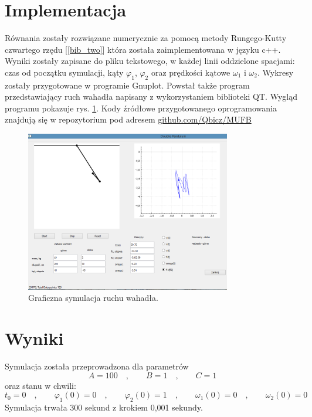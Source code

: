 \documentclass[11pt]{aghdpl}
\begin{document}
\clearpage
\section{Implementacja}
Równania zostały rozwiązane numerycznie za pomocą metody Rungego-Kutty czwartego rzędu [\ref{bib_two}] która została zaimplementowana w języku c++. Wyniki zostały zapisane do pliku tekstowego, w każdej linii oddzielone spacjami: czas od początku symulacji, kąty $\varphi_1$, $\varphi_2$ oraz prędkości kątowe $\omega_1$ i $\omega_2$. Wykresy zostały przygotowane w programie Gnuplot. Powstał także program przedstawiający ruch wahadła napisany z wykorzystaniem biblioteki QT. Wygląd programu pokazuje rys. \ref{QTgui}. Kody źródłowe przygotowanego oprogramowania znajdują się w repozytorium pod adresem \href{http://www.github.com/Qbicz/MUFB}{github.com/Qbicz/MUFB} 
\begin{figure}[h!]
	\centering
	\includegraphics[width=0.8\textwidth]{qtgui.png}
	\caption{Graficzna symulacja ruchu wahadła.}
	\label{QTgui}
\end{figure}

\section{Wyniki}
Symulacja została przeprowadzona dla parametrów 
\begin{equation}
	A = 100\quad , \qquad B = 1 \quad , \qquad C = 1
\end{equation} 
oraz stanu w chwili:
\begin{equation} \nonumber
	t_0=0 \quad , \qquad \varphi_1(0) = 0 \quad , \qquad 			\varphi_2(0) = 1 \quad , \qquad \omega_1(0) = 0 \quad , 		\qquad \omega_2(0) = 0
\end{equation}
Symulacja trwała 300 sekund z krokiem 0,001 sekundy.
\end{document}
